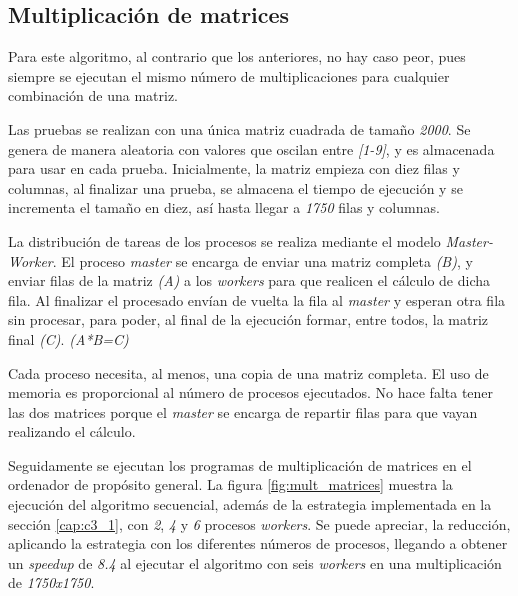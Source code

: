 		

	\subsection{Multiplicación de matrices}
		
		Para este algoritmo, al contrario que los anteriores, no hay caso peor, pues siempre se ejecutan el mismo número de multiplicaciones para cualquier combinación de una matriz. 
		
		Las pruebas se realizan con una única matriz cuadrada de tamaño \textit{2000}. Se genera de manera aleatoria con valores que oscilan entre \textit{[1-9]}, y es almacenada para usar en cada prueba. Inicialmente, la matriz empieza con diez filas y columnas, al finalizar una prueba, se almacena el tiempo de ejecución y se incrementa el tamaño en diez, así hasta llegar a \textit{1750} filas y columnas. 
		
		La distribución de tareas de los procesos se realiza mediante el modelo \textit{Master-Worker}. El proceso \textit{master} se encarga de enviar una matriz completa \textit{(B)}, y enviar filas de la matriz \textit{(A)} a los \textit{workers} para que realicen el cálculo de dicha fila. Al finalizar el procesado envían de vuelta la fila al \textit{master} y esperan otra fila sin procesar, para poder, al final de la ejecución formar, entre todos, la matriz final \textit{(C)}. \textit{(A*B=C)}
	
		Cada proceso necesita, al menos, una copia de una matriz completa. El uso de memoria es proporcional al número de procesos ejecutados. No hace falta tener las dos matrices porque el \textit{master} se encarga de repartir filas para que vayan realizando el cálculo.
		
		\vspace*{0.2cm}
	
		Seguidamente se ejecutan los programas de multiplicación de matrices en el ordenador de propósito general. La figura \ref{fig:mult_matrices} muestra la ejecución del algoritmo secuencial, además de la estrategia implementada en la sección \ref{cap:c3_1}, con \textit{2}, \textit{4} y \textit{6} procesos \textit{workers}. Se puede apreciar, la reducción, aplicando la estrategia con los diferentes números de procesos, llegando a obtener un \textit{speedup} de \textit{8.4} al ejecutar el algoritmo con seis \textit{workers} en una multiplicación de \textit{1750x1750}.
		
